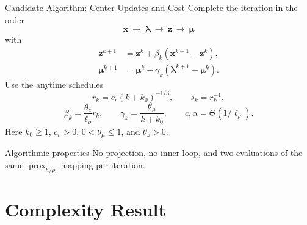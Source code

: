 \documentclass[handout,compress,9pt]{beamer}
\newcommand{\bx}{\bm{x}}
\newcommand{\bz}{\bm{z}}
\newcommand{\bmu}{\bm{\mu}}
\newcommand{\blmbd}{\bm{\lambda}}
\newcommand{\prox}{\operatorname{prox}}
\begin{document}
\begin{frame}{Candidate Algorithm: Center Updates and Cost}
\footnotesize
Complete the iteration in the order
\begin{equation*}
  \boxed{\bx\ \longrightarrow\ \blmbd\ \longrightarrow\ \bz\ \longrightarrow\ \bmu}
\end{equation*}
with
\begin{equation*}
\begin{aligned}
  \bz^{k+1}
  &=\bz^k+\beta_k(\bx^{k+1}-\bz^k),\\
  \bmu^{k+1}
  &=\bmu^k+\gamma_k(\blmbd^{k+1}-\bmu^k).
\end{aligned}
\end{equation*}
Use the anytime schedules
\begin{equation*}
  r_k=c_r(k+k_0)^{-1/3},
  \qquad s_k=r_k^{-1},
\end{equation*}
\begin{equation*}
  \beta_k=\frac{\theta_z}{\ell_\rho}r_k,
  \qquad
  \gamma_k=\frac{\theta_\mu}{k+k_0},
  \qquad
  c,\alpha=\Theta(1/\ell_\rho).
\end{equation*}
Here $k_0\ge1$, $c_r>0$, $0<\theta_\mu\le1$, and $\theta_z>0$.
\begin{block}{Algorithmic properties}
No projection, no inner loop, and two evaluations of the same
$\prox_{h/\rho}$ mapping per iteration.
\end{block}
\end{frame}

\section{Complexity Result}
\end{document}
